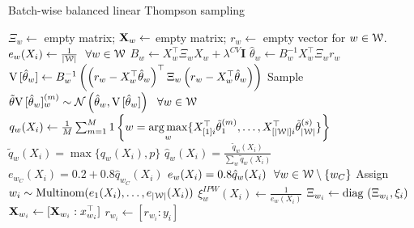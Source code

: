 \documentclass[letterpaper, 12pt, parskip=full,]{scrartcl}
\begin{document}
\begin{algorithm} \footnotesize
    \caption{Batch-wise balanced linear Thompson sampling}
    \label{algg:bblts}
    \begin{algorithmic}[1] %
    	\State$\Xi_w \leftarrow$ empty matrix; $\mathbf{X}_w \leftarrow$ empty matrix; $r_w \leftarrow$ empty vector for $w \in {\EuScript W}$. 
			 \State $e_{w}(X_i) \leftarrow \frac{1 }{|{\EuScript W}| } \ \ \forall w \in {\EuScript W} $ 
					\State $B_w \leftarrow X^\top_w \Xi_w X_w + \lambda^{CV} \mathbf{I}$ 
					\State $\hat\theta_{w} \leftarrow B_w^{-1} X_w^\top \Xi_w r_w$
					\State ${\textrm V}\,[\hat\theta_{w}] \leftarrow B_w^{-1} \left(\left( r_w - X_w^\top\hat\theta_{w} \right)^\top \Xi_w \left( r_w - X_w^\top\hat\theta_{w} \right)\right)$
				\EndFor
			\EndIf
				\State Sample $\tilde \theta \V[\hat\theta_{w}]^{(m)}_w \sim \mathcal{N}\left(\hat\theta_{w}, \V[\hat\theta_{w}] \right) \ \   \forall w \in \ww$
			 \EndFor
				\State $q_w(X_i) \leftarrow \frac{1}{M} \sum_{m=1}^M 1\left\{ w = \underset{w}{\operatorname*{arg\,max}} \{ X_{[1]i}^\top \tilde \theta ^{(m)}_1, \dots, X_{[|{\EuScript W}|]i}^\top\tilde \theta_{|{\EuScript W}|}^{(s)} \}  \right\}$ 
     			\State $\tilde{q}_w(X_i) =\max\Biggr\{q_w{(X_i)}, p\Biggr\}$ 
     			\State $\hat{q}_w(X_i) = \frac{ \tilde{q}_w(X_i)}{\sum\limits_{w }\tilde{q}_w(X_i) }$
			\State $e_{w_C}(X_i)  = 0.2 + 0.8\hat{q}_{w_C}(X_i) $ 
                         \State $e_{w}(X_i)  = 0.8\hat{q}_w(X_i) \ \ \forall w \in {\EuScript W} \setminus \{w_C\}$   
		\EndIf
		\State Assign $w_i \sim \textrm{Multinom}( e_{1}(X_i) , \dots,  e_{|{\EuScript W}|}(X_i) )$
		\State $\xi^{IPW}_w(X_i) \leftarrow \frac{ 1 }{e_{w}(X_i)}$ 
		\State $\Xi_{w_i} \leftarrow {\textrm {diag} }\, \left(\Xi_{w_i}, \xi_i\right)$ 
		\State $\mathbf{X}_{w_i} \leftarrow [\mathbf{X}_{w_i}:x_{w_i}^\top]$ 
		\State $r_{w_i} \leftarrow  [r_{w_i}: y_i]$ 

	\EndFor
    \end{algorithmic}
\end{algorithm}
\end{document}
